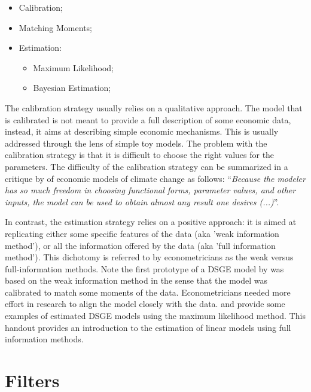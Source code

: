 \documentclass[a4paper,12pt]{article}%
\begin{document}
\begin{itemize}
\item Calibration;

\item Matching Moments;

\item Estimation:

\begin{itemize}
\item Maximum Likelihood;

\item Bayesian Estimation;
\end{itemize}
\end{itemize}
The calibration strategy usually relies on a \textsf{qualitative approach}.
The model that is calibrated is not meant to provide a full description of
some economic data, instead, it aims at describing simple economic
mechanisms. This is usually addressed through the lens of simple toy models.
The problem with the calibration strategy is that it is difficult to choose the
right values for the parameters. The difficulty of the calibration strategy
can be summarized in a critique by \cite{pindyck2017use} of economic models of
climate change as follows: \textquotedblleft\textit{Because the modeler has so
much freedom in choosing functional forms, parameter values, and other inputs, the model can be used to obtain
almost any result one desires (...)}\textquotedblright.

In contrast, the estimation strategy relies on a positive approach: it is
aimed at replicating either some specific features of the data (aka
'\textsf{weak information method}'), or all the information offered by the
data (aka '\textsf{full information method}'). This dichotomy is referred to by
econometricians as the weak versus full-information methods. Note the first
prototype of a DSGE model by \cite{kydland1982time} was based on the weak
information method in the sense that the model was calibrated to match some
moments of the data. Econometricians needed more effort in research to align the
model closely with the data. \cite{taylor1990solving} and \cite{fair1990full} provide
some examples of estimated DSGE models using the maximum
likelihood method. This handout provides an introduction to the estimation of linear
models using full information methods.


\newpage

\section{Filters}
\end{document}
